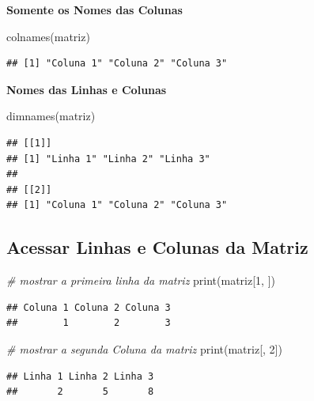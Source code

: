 \documentclass[
]{article}
\newenvironment{Shaded}{\begin{snugshade}}{\end{snugshade}}
\newcommand{\CommentTok}[1]{\textcolor[rgb]{0.56,0.35,0.01}{\textit{#1}}}
\newcommand{\DecValTok}[1]{\textcolor[rgb]{0.00,0.00,0.81}{#1}}
\newcommand{\FunctionTok}[1]{\textcolor[rgb]{0.00,0.00,0.00}{#1}}
\newcommand{\NormalTok}[1]{#1}
\begin{document}
\textbf{Somente os Nomes das Colunas}

\begin{Shaded}
\begin{Highlighting}[]
\FunctionTok{colnames}\NormalTok{(matriz)}
\end{Highlighting}
\end{Shaded}

\begin{verbatim}
## [1] "Coluna 1" "Coluna 2" "Coluna 3"
\end{verbatim}

\textbf{Nomes das Linhas e Colunas}

\begin{Shaded}
\begin{Highlighting}[]
\FunctionTok{dimnames}\NormalTok{(matriz)}
\end{Highlighting}
\end{Shaded}

\begin{verbatim}
## [[1]]
## [1] "Linha 1" "Linha 2" "Linha 3"
## 
## [[2]]
## [1] "Coluna 1" "Coluna 2" "Coluna 3"
\end{verbatim}

\hypertarget{acessar-linhas-e-colunas-da-matriz}{%
\subsection{Acessar Linhas e Colunas da
Matriz}\label{acessar-linhas-e-colunas-da-matriz}}

\begin{Shaded}
\begin{Highlighting}[]
\CommentTok{\# mostrar a primeira linha da matriz}
\FunctionTok{print}\NormalTok{(matriz[}\DecValTok{1}\NormalTok{, ])}
\end{Highlighting}
\end{Shaded}

\begin{verbatim}
## Coluna 1 Coluna 2 Coluna 3 
##        1        2        3
\end{verbatim}

\begin{Shaded}
\begin{Highlighting}[]
\CommentTok{\# mostrar a segunda Coluna da matriz}
\FunctionTok{print}\NormalTok{(matriz[, }\DecValTok{2}\NormalTok{])}
\end{Highlighting}
\end{Shaded}

\begin{verbatim}
## Linha 1 Linha 2 Linha 3 
##       2       5       8
\end{verbatim}
\end{document}
